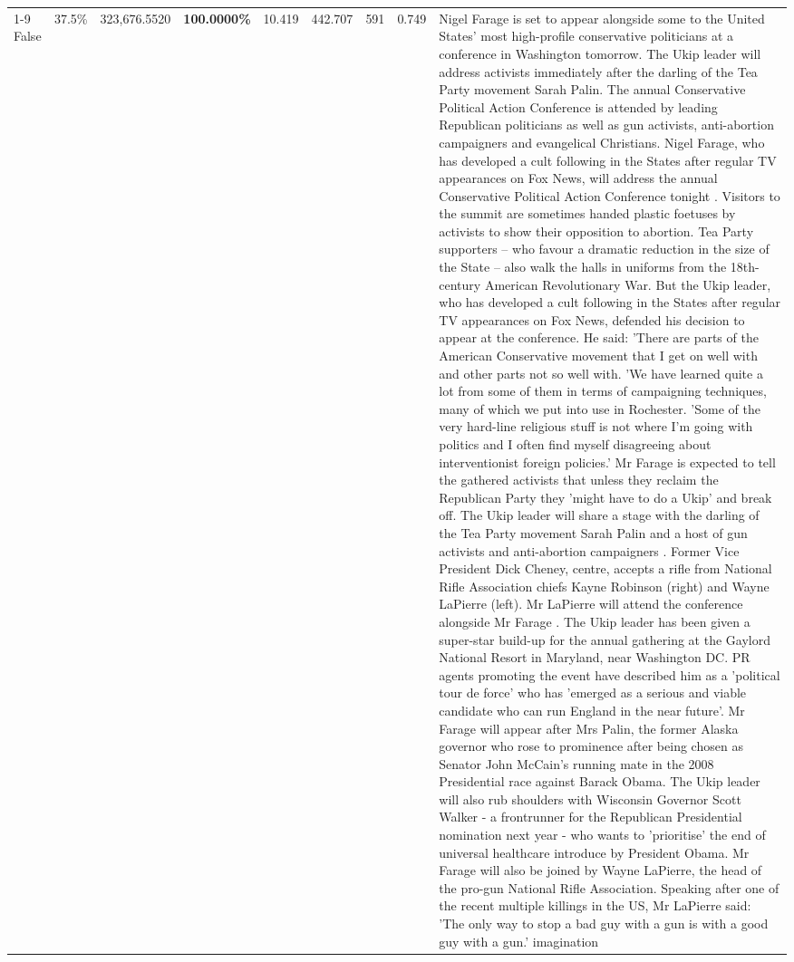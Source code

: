 \begin{table}[H]
\begin{tabular}{lllrlllll}
\cline{1-9}
False & 37.5\% & 323,676.5520 & \bfseries \color{red} 100.0000\% & 10.419 & 442.707 & 591 & 0.749 & Nigel Farage is set to appear alongside some to the United States' most high-profile conservative politicians at a conference in Washington tomorrow. The Ukip leader will address activists immediately after the darling of the Tea Party movement Sarah Palin. The annual Conservative Political Action Conference is attended by leading Republican politicians as well as gun activists, anti-abortion campaigners and evangelical Christians. Nigel Farage, who has developed a cult following in the States after regular TV appearances on Fox News, will address the annual Conservative Political Action Conference tonight . Visitors to the summit are sometimes handed plastic foetuses by activists to show their opposition to abortion. Tea Party supporters – who favour a dramatic reduction in the size of the State – also walk the halls in uniforms from the 18th-century American Revolutionary War. But the Ukip leader, who has developed a cult following in the States after regular TV appearances on Fox News, defended his decision to appear at the conference. He said: 'There are parts of the American Conservative movement that I get on well with and other parts not so well with. 'We have learned quite a lot from some of them in terms of campaigning techniques, many of which we put into use in Rochester. 'Some of the very hard-line religious stuff is not where I'm going with politics and I often find myself disagreeing about interventionist foreign policies.' Mr Farage is expected to tell the gathered activists that unless they reclaim the Republican Party they 'might have to do a Ukip' and break off. The Ukip leader will share a stage with the darling of the Tea Party movement Sarah Palin and a host of gun activists and anti-abortion campaigners . Former Vice President Dick Cheney, centre, accepts a rifle from National Rifle Association chiefs Kayne Robinson (right) and Wayne LaPierre (left). Mr LaPierre will attend the conference alongside Mr Farage . The Ukip leader has been given a super-star build-up for the annual gathering at the Gaylord National Resort in Maryland, near Washington DC. PR agents promoting the event have described him as a 'political tour de force' who has 'emerged as a serious and viable candidate who can run England in the near future'. Mr Farage will appear after Mrs Palin, the former Alaska governor who rose to prominence after being chosen as Senator John McCain's running mate in the 2008 Presidential race against Barack Obama. The Ukip leader will also rub shoulders with Wisconsin Governor Scott Walker - a frontrunner for the Republican Presidential nomination next year - who wants to 'prioritise' the end of universal healthcare introduce by President Obama. Mr Farage will also be joined by Wayne LaPierre, the head of the pro-gun National Rifle Association. Speaking after one of the recent multiple killings in the US, Mr LaPierre said: 'The only way to stop a bad guy with a gun is with a good guy with a gun.' imagination \\

\end{tabular}
\end{table}
